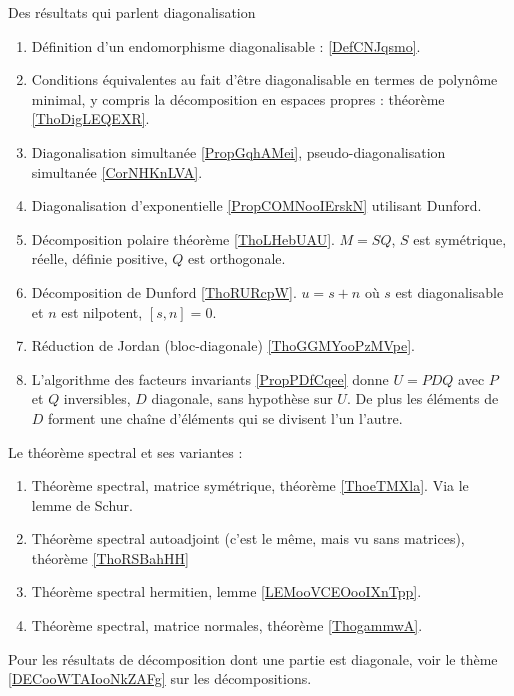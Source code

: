     Des résultats qui parlent diagonalisation
    \begin{enumerate}
        \item
            Définition d'un endomorphisme diagonalisable : \ref{DefCNJqsmo}.
        \item
            Conditions équivalentes au fait d'être diagonalisable en termes de polynôme minimal, y compris la décomposition en espaces propres : théorème \ref{ThoDigLEQEXR}.
        \item
            Diagonalisation simultanée \ref{PropGqhAMei}, pseudo-diagonalisation simultanée \ref{CorNHKnLVA}.
        \item
            Diagonalisation d'exponentielle \ref{PropCOMNooIErskN} utilisant Dunford.
        \item
            Décomposition polaire théorème \ref{ThoLHebUAU}. \( M=SQ\), \( S\) est symétrique, réelle, définie positive, \( Q\) est orthogonale.
        \item
            Décomposition de Dunford \ref{ThoRURcpW}. \( u=s+n\) où \( s\) est diagonalisable et \( n\) est nilpotent, \( [s,n]=0\).
        \item 
            Réduction de Jordan (bloc-diagonale) \ref{ThoGGMYooPzMVpe}.
        \item 
            L'algorithme des facteurs invariants \ref{PropPDfCqee} donne \( U=PDQ\) avec \( P\) et \( Q\) inversibles, \( D\) diagonale, sans hypothèse sur \( U\). De plus les éléments de \( D\) forment une chaîne d'éléments qui se divisent l'un l'autre.
        \end{enumerate}
        Le théorème spectral et ses variantes :
        \begin{enumerate}
            \item
                Théorème spectral, matrice symétrique, théorème \ref{ThoeTMXla}. Via le lemme de Schur.
            \item
                Théorème spectral autoadjoint (c'est le même, mais vu sans matrices), théorème \ref{ThoRSBahHH}
            \item
                Théorème spectral hermitien, lemme \ref{LEMooVCEOooIXnTpp}.
            \item
                Théorème spectral, matrice normales, théorème \ref{ThogammwA}.
            \end{enumerate}
        Pour les résultats de décomposition dont une partie est diagonale, voir le thème \ref{DECooWTAIooNkZAFg} sur les décompositions.

